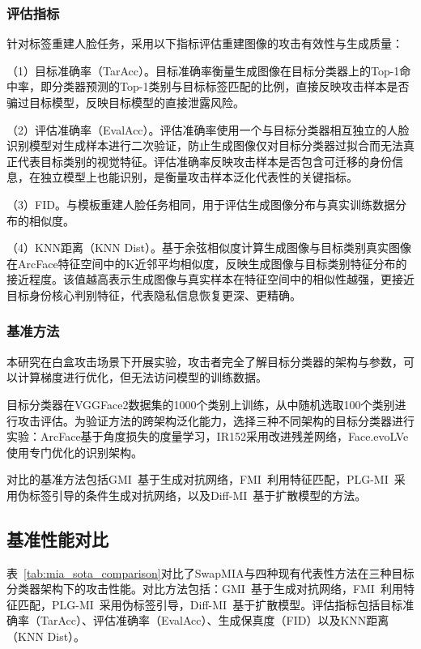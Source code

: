 \subsubsection{评估指标}

针对标签重建人脸任务，采用以下指标评估重建图像的攻击有效性与生成质量：

（1）目标准确率（TarAcc）。目标准确率衡量生成图像在目标分类器上的Top-1命中率，即分类器预测的Top-1类别与目标标签匹配的比例，直接反映攻击样本是否骗过目标模型，反映目标模型的直接泄露风险。

（2）评估准确率（EvalAcc）。评估准确率使用一个与目标分类器相互独立的人脸识别模型对生成样本进行二次验证，防止生成图像仅对目标分类器过拟合而无法真正代表目标类别的视觉特征。评估准确率反映攻击样本是否包含可迁移的身份信息，在独立模型上也能识别，是衡量攻击样本泛化代表性的关键指标。

（3）FID。与模板重建人脸任务相同，用于评估生成图像分布与真实训练数据分布的相似度。

（4）KNN距离（KNN Dist）。基于余弦相似度计算生成图像与目标类别真实图像在ArcFace特征空间中的K近邻平均相似度，反映生成图像与目标类别特征分布的接近程度。该值越高表示生成图像与真实样本在特征空间中的相似性越强，更接近目标身份核心判别特征，代表隐私信息恢复更深、更精确。

\subsubsection{基准方法}

本研究在白盒攻击场景下开展实验，攻击者完全了解目标分类器的架构与参数，可以计算梯度进行优化，但无法访问模型的训练数据。

目标分类器在VGGFace2数据集的1000个类别上训练，从中随机选取100个类别进行攻击评估。为验证方法的跨架构泛化能力，选择三种不同架构的目标分类器进行实验：ArcFace基于角度损失的度量学习，IR152采用改进残差网络，Face.evoLVe使用专门优化的识别架构。

对比的基准方法包括GMI~\cite{zhang2020secret}基于生成对抗网络，FMI~\cite{khosravy2022model}利用特征匹配，PLG-MI~\cite{yuan2023pseudo}采用伪标签引导的条件生成对抗网络，以及Diff-MI~\cite{li2024model}基于扩散模型的方法。

\subsection{基准性能对比}
\label{sec:mia_benchmark}

表~\ref{tab:mia_sota_comparison}对比了SwapMIA与四种现有代表性方法在三种目标分类器架构下的攻击性能。对比方法包括：GMI~\cite{zhang2020secret}基于生成对抗网络，FMI~\cite{khosravy2022model}利用特征匹配，PLG-MI~\cite{yuan2023pseudo}采用伪标签引导，Diff-MI~\cite{li2024model}基于扩散模型。评估指标包括目标准确率（TarAcc）、评估准确率（EvalAcc）、生成保真度（FID）以及KNN距离（KNN Dist）。

